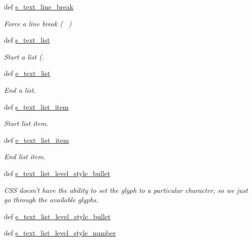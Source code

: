 \begin{DoxyCompactItemize}
def \hyperlink{classodf_1_1odf2xhtml_1_1ODF2XHTML_ac4bc0122912414ccea98cad09710686e}{s\+\_\+text\+\_\+line\+\_\+break}
\begin{DoxyCompactList}\small\item\em Force a line break (~\newline
) \end{DoxyCompactList}\item 
def \hyperlink{classodf_1_1odf2xhtml_1_1ODF2XHTML_a75bf881493ea564e61098142a2d78f84}{s\+\_\+text\+\_\+list}
\begin{DoxyCompactList}\small\item\em Start a list (. \end{DoxyCompactList}\item 
def \hyperlink{classodf_1_1odf2xhtml_1_1ODF2XHTML_aa26f15129f53a46093ddd98b5f3fbb0b}{e\+\_\+text\+\_\+list}
\begin{DoxyCompactList}\small\item\em End a list. \end{DoxyCompactList}\item 
def \hyperlink{classodf_1_1odf2xhtml_1_1ODF2XHTML_a890c41a8565eca9b70fe2c350048f04b}{s\+\_\+text\+\_\+list\+\_\+item}
\begin{DoxyCompactList}\small\item\em Start list item. \end{DoxyCompactList}\item 
def \hyperlink{classodf_1_1odf2xhtml_1_1ODF2XHTML_a096fd2025dd1ea4c614970070880826c}{e\+\_\+text\+\_\+list\+\_\+item}
\begin{DoxyCompactList}\small\item\em End list item. \end{DoxyCompactList}\item 
def \hyperlink{classodf_1_1odf2xhtml_1_1ODF2XHTML_ae03e45d2c53ae14c46f7cbb3ebf3137f}{s\+\_\+text\+\_\+list\+\_\+level\+\_\+style\+\_\+bullet}
\begin{DoxyCompactList}\small\item\em C\+S\+S doesn't have the ability to set the glyph to a particular character, so we just go through the available glyphs. \end{DoxyCompactList}\item 
def \hyperlink{classodf_1_1odf2xhtml_1_1ODF2XHTML_adc07d3b0c6e7ee3b8b241e4b05b332c2}{e\+\_\+text\+\_\+list\+\_\+level\+\_\+style\+\_\+bullet}
\item 
def \hyperlink{classodf_1_1odf2xhtml_1_1ODF2XHTML_a3814bf44a0cad1efe4c83d552d286dc0}{s\+\_\+text\+\_\+list\+\_\+level\+\_\+style\+\_\+number}

\end{DoxyCompactItemize}
